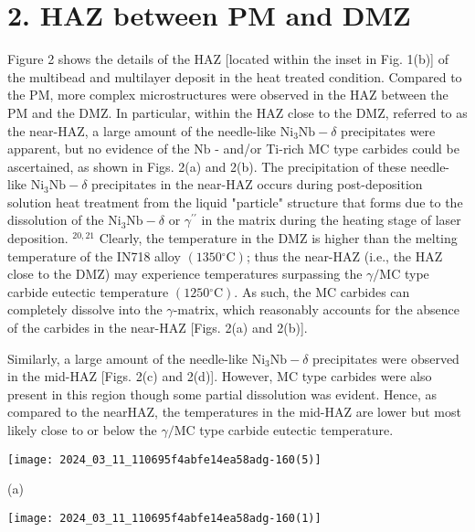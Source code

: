 \documentclass[10pt]{article}
\begin{document}
\section*{2. HAZ between PM and DMZ}
Figure 2 shows the details of the HAZ [located within the inset in Fig. 1(b)] of the multibead and multilayer deposit in the heat treated condition. Compared to the PM, more complex microstructures were observed in the HAZ between the PM and the DMZ. In particular, within the HAZ close to the DMZ, referred to as the near-HAZ, a large amount of the needle-like $\mathrm{Ni}_{3} \mathrm{Nb}-\delta$ precipitates were apparent, but no evidence of the $\mathrm{Nb}$ - and/or Ti-rich MC type carbides could be ascertained, as shown in Figs. 2(a) and 2(b). The precipitation of these needle-like $\mathrm{Ni}_{3} \mathrm{Nb}-\delta$ precipitates in the near-HAZ occurs during post-deposition solution heat treatment from the liquid "particle" structure that forms due to the dissolution of the $\mathrm{Ni}_{3} \mathrm{Nb}-\delta$ or $\gamma^{\prime \prime}$ in the matrix during the heating stage of laser deposition. ${ }^{20,21}$ Clearly, the temperature in the DMZ is higher than the melting temperature of the IN718 alloy $\left(1350{ }^{\circ} \mathrm{C}\right)$; thus the near-HAZ (i.e., the HAZ close to the DMZ) may experience temperatures surpassing the $\gamma / \mathrm{MC}$ type carbide eutectic temperature $\left(1250{ }^{\circ} \mathrm{C}\right)$. As such, the MC carbides can completely dissolve into the $\gamma$-matrix, which reasonably accounts for the absence of the carbides in the near-HAZ [Figs. 2(a) and 2(b)].

Similarly, a large amount of the needle-like $\mathrm{Ni}_{3} \mathrm{Nb}-\delta$ precipitates were observed in the mid-HAZ [Figs. 2(c) and 2(d)]. However, MC type carbides were also present in this region though some partial dissolution was evident. Hence, as compared to the near$\mathrm{HAZ}$, the temperatures in the mid-HAZ are lower but most likely close to or below the $\gamma / \mathrm{MC}$ type carbide eutectic temperature.

\begin{center}
\texttt{[image: 2024\_03\_11\_110695f4abfe14ea58adg-160(5)]}
\end{center}

(a)

\begin{center}
\texttt{[image: 2024\_03\_11\_110695f4abfe14ea58adg-160(1)]}
\end{center}
\end{document}

